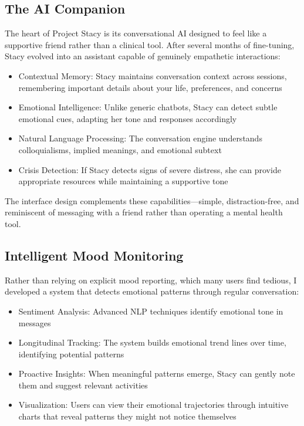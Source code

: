 \documentclass[12pt]{article}
\begin{document}
\subsection{The AI Companion}

The heart of Project Stacy is its conversational AI designed to feel like a supportive friend rather than a clinical tool. After several months of fine-tuning, Stacy evolved into an assistant capable of genuinely empathetic interactions:

\begin{itemize}
    \item Contextual Memory: Stacy maintains conversation context across sessions, remembering important details about your life, preferences, and concerns
    \item Emotional Intelligence: Unlike generic chatbots, Stacy can detect subtle emotional cues, adapting her tone and responses accordingly
    \item Natural Language Processing: The conversation engine understands colloquialisms, implied meanings, and emotional subtext
    \item Crisis Detection: If Stacy detects signs of severe distress, she can provide appropriate resources while maintaining a supportive tone
\end{itemize}

The interface design complements these capabilities—simple, distraction-free, and reminiscent of messaging with a friend rather than operating a mental health tool.

\subsection{Intelligent Mood Monitoring}

Rather than relying on explicit mood reporting, which many users find tedious, I developed a system that detects emotional patterns through regular conversation:

\begin{itemize}
    \item Sentiment Analysis: Advanced NLP techniques identify emotional tone in messages
    \item Longitudinal Tracking: The system builds emotional trend lines over time, identifying potential patterns
    \item Proactive Insights: When meaningful patterns emerge, Stacy can gently note them and suggest relevant activities
    \item Visualization: Users can view their emotional trajectories through intuitive charts that reveal patterns they might not notice themselves
\end{itemize}
\end{document}
